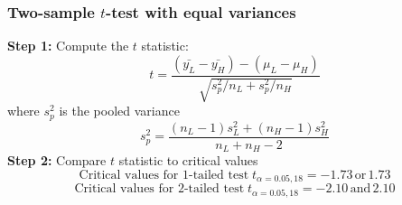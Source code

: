 \documentclass[color=usenames,dvipsnames]{beamer}\usepackage[]{graphicx}\usepackage[]{color}
\begin{document}
\begin{frame}[fragile]
  \frametitle{Two-sample $t$-test with equal variances}
  {\bf Step 1:} Compute the $t$ statistic:
  \[
  t = \frac{(\bar{y_L} - \bar{y_H}) - (\mu_L - \mu_H)}{
    \sqrt{s^2_p/n_L + s^2_p/n_H}}
  \]
  where $s^2_p$ is the pooled variance
  \[
  s^2_p = \frac{(n_L-1)s^2_L + (n_H-1)s^2_H}{n_L + n_H - 2}
  \]
  \pause
  {\bf Step 2:} Compare $t$ statistic to critical values
  \[
     \mbox{Critical values for 1-tailed test}\; t_{\alpha=0.05,18}= -1.73\, \mathrm{or}\, 1.73
  \]
  \[
     \mbox{Critical values for 2-tailed test}\; t_{\alpha=0.05,18}= -2.10\, \mathrm{and}\, 2.10
  \]
\end{frame}





\end{document}
